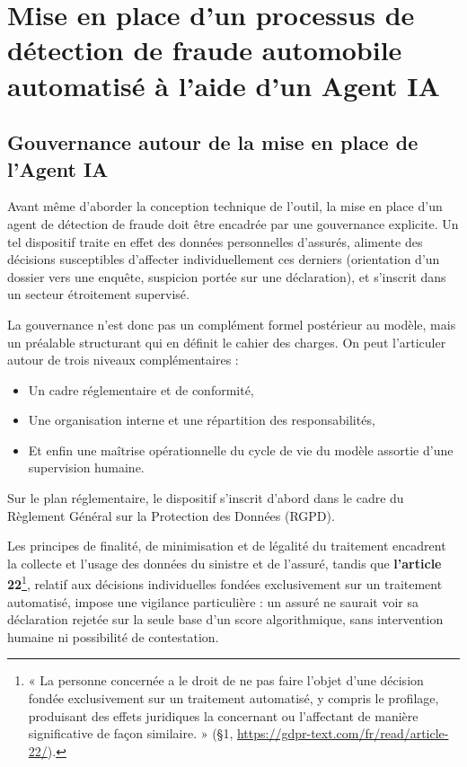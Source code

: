 
\chapter{Mise en place d'un processus de détection de fraude automobile automatisé à l'aide d'un Agent IA}
\label{chap:mise-en-place}

\section{Gouvernance autour de la mise en place de l'Agent IA}
\label{sec:gouvernance}

Avant même d'aborder la conception technique de l'outil, la mise en place d'un agent de détection de fraude doit être encadrée par une gouvernance explicite. Un tel dispositif traite en effet des données personnelles d'assurés, alimente des décisions susceptibles d'affecter individuellement ces derniers (orientation d'un dossier vers une enquête, suspicion portée sur une déclaration), et s'inscrit dans un secteur étroitement supervisé.

La gouvernance n'est donc pas un complément formel postérieur au modèle, mais un préalable structurant qui en définit le cahier des charges. On peut l'articuler autour de trois niveaux complémentaires :

\begin{itemize}[label = $\bullet$]
    \item Un cadre réglementaire et de conformité,
    \item Une organisation interne et une répartition des responsabilités,
    \item Et enfin une maîtrise opérationnelle du cycle de vie du modèle assortie d'une supervision humaine.
\end{itemize}

Sur le plan réglementaire, le dispositif s'inscrit d'abord dans le cadre du Règlement Général sur la Protection des Données (RGPD).

Les principes de finalité, de minimisation et de légalité du traitement encadrent la collecte et l'usage des données du sinistre et de l'assuré, tandis que \textbf{l'article 22}\footnote{« La personne concernée a le droit de ne pas faire l'objet d'une décision fondée exclusivement sur un traitement automatisé, y compris le profilage, produisant des effets juridiques la concernant ou l'affectant de manière significative de façon similaire. » (§1, \url{https://gdpr-text.com/fr/read/article-22/}).}, relatif aux décisions individuelles fondées exclusivement sur un traitement automatisé, impose une vigilance particulière : un assuré ne saurait voir sa déclaration rejetée sur la seule base d'un score algorithmique, sans intervention humaine ni possibilité de contestation.

